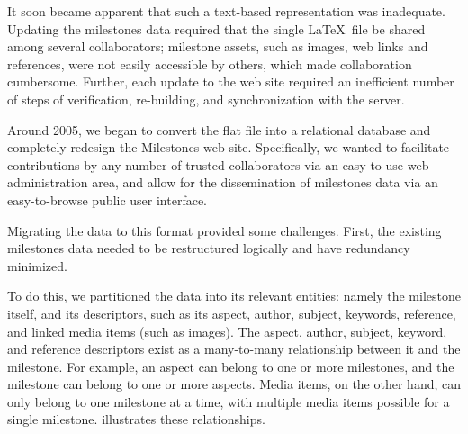 It soon became apparent that such a text-based representation was inadequate. Updating the milestones data required that the single \LaTeX\ file be shared among several collaborators; milestone assets, such as images, web links and references, were not easily accessible by others, which made collaboration cumbersome. Further, each update to the web site required an inefficient number of steps of verification, re-building, and synchronization with the server.

Around 2005, we began to convert the flat file into a relational database and completely redesign the Milestones web site. Specifically, we wanted to facilitate contributions by any number of trusted collaborators via an easy-to-use web administration area, and allow for the dissemination of milestones data via an easy-to-browse public user interface.

Migrating the data to this format provided some challenges. First, the existing milestones data needed to be restructured logically
 and have redundancy minimized. 

To do this, we partitioned the data into its relevant entities: namely the milestone itself, and its descriptors, such as its aspect, author, subject, keywords, reference, and linked media items (such as images). The aspect, author, subject, keyword, and reference descriptors exist as a many-to-many relationship between it and the milestone. For example, an aspect can belong to one or more milestones, and the milestone can belong to one or more aspects. Media items, on the other hand, can only belong to one milestone at a time, with multiple media items possible for a single milestone.  illustrates these relationships.

